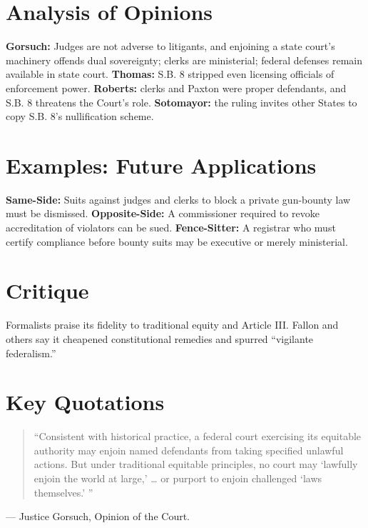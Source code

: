 \documentclass[12pt]{article}
\begin{document}
\section{Analysis of Opinions}
\textbf{Gorsuch:} Judges are not adverse to litigants, and enjoining a state court's machinery offends dual sovereignty; clerks are ministerial; federal defenses remain available in state court. \textbf{Thomas:} S.B. 8 stripped even licensing officials of enforcement power. \textbf{Roberts:} clerks and Paxton were proper defendants, and S.B. 8 threatens the Court's role. \textbf{Sotomayor:} the ruling invites other States to copy S.B. 8's nullification scheme.

\section{Examples: Future Applications}
\textbf{Same-Side:} Suits against judges and clerks to block a private gun-bounty law must be dismissed. \textbf{Opposite-Side:} A commissioner required to revoke accreditation of violators can be sued. \textbf{Fence-Sitter:} A registrar who must certify compliance before bounty suits may be executive or merely ministerial.

\section{Critique}
Formalists praise its fidelity to traditional equity and Article III. Fallon and others say it cheapened constitutional remedies and spurred ``vigilante federalism.''

\section{Key Quotations}
\begin{quote}
``Consistent with historical practice, a federal court exercising its equitable authority may enjoin named defendants from taking specified unlawful actions. But under traditional equitable principles, no court may `lawfully enjoin the world at large,' \dots{} or purport to enjoin challenged `laws themselves.' ''
\end{quote}
\noindent --- Justice Gorsuch, Opinion of the Court.
\end{document}
